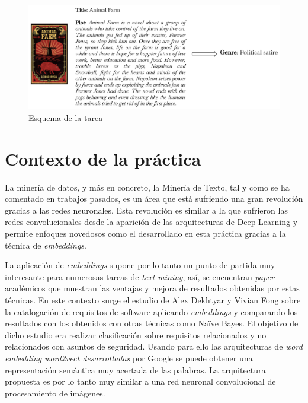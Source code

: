 \documentclass[12pt,a4paper, xcolor=table]{article}
\begin{document}
\vspace{12mm}

  \begin{figure}[!h]
    \centering
    \includegraphics[width=450px]{img/Animal Farm.png}
    \caption{Esquema de la tarea}
    \label{fig:animalFarm}
  \end{figure}

\newpage

\section{Contexto de la práctica}
La minería de datos, y más en concreto, la Minería de Texto, tal y como se ha comentado en trabajos pasados\cite{pr2}, es un área que está sufriendo una gran revolución gracias a las redes neuronales. Esta revolución es similar a la que sufrieron las redes convolucionales desde la aparición de las arquitecturas de Deep Learning y permite enfoques novedosos como el desarrollado en esta práctica gracias a la técnica de \textit{embeddings}.

\vspace{3mm}

La aplicación de \textit{embeddings} supone por lo tanto un punto de partida muy interesante para numerosas tareas de \textit{text-mining}, así, se encuentran \textit{paper} académicos que muestran las ventajas y mejora de resultados obtenidas por estas técnicas. En este contexto surge el estudio de Alex Dekhtyar y Vivian Fong sobre la catalogación de requisitos de software aplicando \textit{embeddings} y comparando los resultados con los obtenidos con otras técnicas como Naïve Bayes\cite{naive}. El objetivo de dicho estudio era realizar clasificación sobre requisitos relacionados y no relacionados con asuntos de seguridad. Usando para ello las arquitecturas de \textit{word embedding} \textit{word2vect desarrolladas} por Google\cite{google} se puede obtener una representación semántica muy acertada de las palabras. La arquitectura propuesta es por lo tanto muy similar a una red neuronal convolucional de procesamiento de imágenes.
\end{document}
